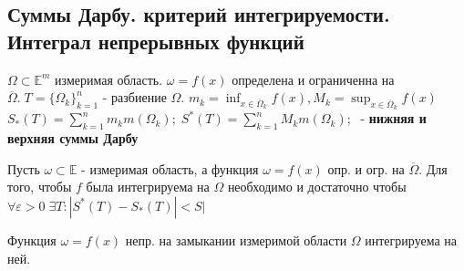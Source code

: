 \subsection{Суммы Дарбу. критерий интегрируемости.\\ Интеграл непрерывных функций}

$\Omega \subset \mathbb{E}^m $ измеримая область. $\omega=f(x) $ определена и ограниченна на $\overline{\Omega}.\; T=\{\Omega_k \}_{k=1}^n $ - разбиение $\Omega$. $m_k=\inf_{x\in \overline{\Omega}_k} f(x) , M_k=\sup_{x\in \overline{\Omega}_k} f(x)$\\
$S_*(T)=\sum_{k=1}^n m_k m(\Omega_k); \; S^*(T)=\sum_{k=1}^n M_k m(\Omega_k); \;  $ - \textbf{ нижняя и верхняя  суммы Дарбу}
 
\begin{theorem}
	Пусть $\omega\subset \mathbb{E}$ - измеримая область, а функция $\omega=f(x)$ опр. и огр. на $\overline{\Omega}$. Для того, чтобы $f $ была интегрируема на $\Omega$ необходимо и достаточно чтобы $\boxed{\forall \varepsilon>0\; \exists T: |S^*(T) - S_*(T)|<S |} $
\end{theorem}

\begin{theorem}
	Функция $\omega=f(x)$ непр. на замыкании измеримой области $\Omega $ интегрируема на ней.
\end{theorem}





